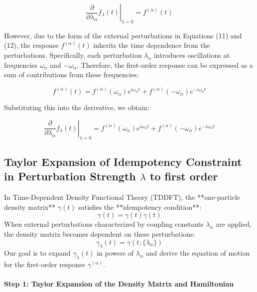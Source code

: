 \documentclass[12pt]{article}
\begin{document}
\[
\left.\frac{\partial}{\partial \lambda_{\alpha}} f_{\lambda}(t)\right|_{\lambda=0} = f^{(\alpha)}(t)
\]

\noindent However, due to the form of the external perturbations in Equations (11) and (12), the response \( f^{(\alpha)}(t) \) inherits the time dependence from the perturbations. Specifically, each perturbation \( \lambda_{\alpha} \) introduces oscillations at frequencies \( \omega_{\alpha} \) and \( -\omega_{\alpha} \). Therefore, the first-order response can be expressed as a sum of contributions from these frequencies:

\[
f^{(\alpha)}(t) = f^{(\alpha)}(\omega_{\alpha}) e^{i \omega_{\alpha} t} + f^{(\alpha)}(-\omega_{\alpha}) e^{-i \omega_{\alpha} t}
\]

\noindent Substituting this into the derivative, we obtain:

\[
\left.\frac{\partial}{\partial \lambda_{\alpha}} f_{\lambda}(t)\right|_{\lambda=0} = f^{(\alpha)}(\omega_{\alpha}) e^{i \omega_{\alpha} t} + f^{(\alpha)}(-\omega_{\alpha}) e^{-i \omega_{\alpha} t} 
\]


\subsection{Taylor Expansion of Idempotency Constraint in Perturbation Strength $\lambda$ to first order}
\label{sec:firstOrderIdempotency}

In Time-Dependent Density Functional Theory (TDDFT), the **one-particle density matrix** \( \gamma(t) \) satisfies the **idempotency condition**:
\begin{equation}
\gamma(t) = \gamma(t) \gamma(t) \end{equation}
When external perturbations characterized by coupling constants \( \lambda_{\alpha} \) are applied, the density matrix becomes dependent on these perturbations:
\begin{equation}
\gamma_{\lambda}(t) = \gamma(t; \{\lambda_{\alpha}\}) \end{equation}
Our goal is to expand \( \gamma_{\lambda}(t) \) in powers of \( \lambda_{\alpha} \) and derive the equation of motion for the first-order response \( \gamma^{(\alpha)} \).

\paragraph{Step 1: Taylor Expansion of the Density Matrix and Hamiltonian}
\end{document}
